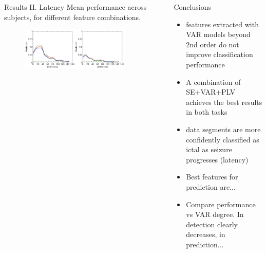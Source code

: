 \documentclass[final,t,overlay, xcolor=table, sans, mathserif]{beamer}
\begin{document}
\begin{frame}{}
\begin{columns}[t]
\begin{column}{.65\linewidth}
\begin{columns}
\begin{block}{Results II. Latency}
\centering
Mean performance across subjects, for different feature combinations.
\begin{figure}
\includegraphics[width=0.85\textwidth]{figures/all_latency.pdf}
\end{figure}
\end{block}
\begin{block}{Conclusions}
\begin{itemize}
\item features extracted with VAR models beyond 2nd order do not improve classification performance
\item A combination of SE+VAR+PLV achieves the best results in both tasks
\item data segments are more confidently classified as ictal as seizure progresses (latency)
\item Best features for prediction are...
\item Compare performance vs VAR degree. In detection clearly decreases, in prediction...
\end{itemize}
\end{block}
\end{columns}



\end{column}
\end{columns}


\end{frame}
\end{document}
